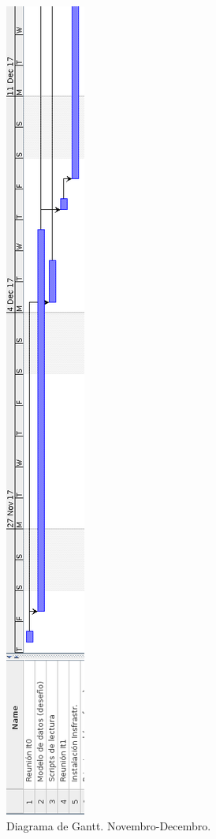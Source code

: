 \begin{figure}[H]
	\centering
	\includegraphics[scale=0.45,keepaspectratio=true]{./images/gantt/g1.png}
	\caption{Diagrama de Gantt. Novembro-Decembro.}
\end{figure}

